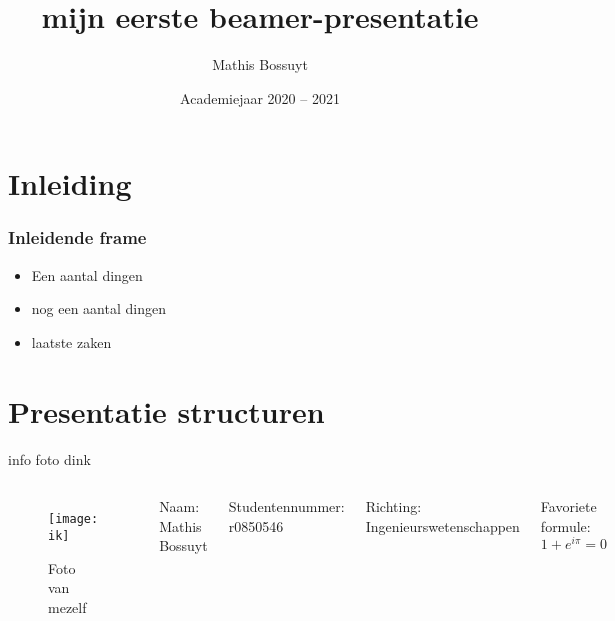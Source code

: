 \documentclass[aspectratio=169,kulak,t]{kulakbeamer} %
\title[Korte titel]{mijn eerste beamer-presentatie}
\author[Korte naam]{Mathis Bossuyt}
\institute[Kulak]{KU Leuven Kulak}
\date{Academiejaar 2020 -- 2021}
\begin{document}
\begin{titleframe}
\titlepage
\end{titleframe}

\begin{outlineframe}[Overzicht]
\tableofcontents
\end{outlineframe}



\section{Inleiding}

\begin{frame}
\frametitle{Inleidende frame}
\begin{itemize}
	\item Een aantal dingen
	\item nog een aantal dingen
	\item laatste zaken
\end{itemize}
 
\end{frame}

\section{Presentatie structuren}

\begin{frame}{info foto dink}
	
	\begin{columns}
		\begin{figure}
			\texttt{[image: ik]}
			\caption{Foto van mezelf}
			
			
		\end{figure}
		
	
	
	
		Naam:
		Mathis Bossuyt
		
		
		Studentennummer:
		r0850546
		
		
		Richting:
		Ingenieurswetenschappen
		
		
		Favoriete formule:
		\begin{equation}
			1+e^{i\pi}=0	
		\end{equation}
		
		
		
	\end{columns}
	
	
\end{frame}	
\end{document}
